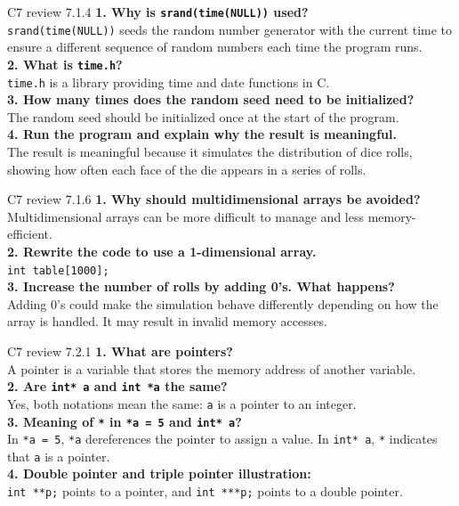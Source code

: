 \documentclass[
	11pt, %
]{beamer}
\begin{document}

\begin{frame}{C7 review 7.1.4}
    \textbf{1. Why is \texttt{srand(time(NULL))} used?} \\
    \texttt{srand(time(NULL))} seeds the random number generator with the current time to ensure a different sequence of random numbers each time the program runs. \\
    \textbf{2. What is \texttt{time.h}?} \\
    \texttt{time.h} is a library providing time and date functions in C. \\
    \textbf{3. How many times does the random seed need to be initialized?} \\
    The random seed should be initialized once at the start of the program. \\
    \textbf{4. Run the program and explain why the result is meaningful.} \\
    The result is meaningful because it simulates the distribution of dice rolls, showing how often each face of the die appears in a series of rolls. \\
\end{frame}


\begin{frame}{C7 review 7.1.6}
    \textbf{1. Why should multidimensional arrays be avoided?} \\
    Multidimensional arrays can be more difficult to manage and less memory-efficient. \\
    \textbf{2. Rewrite the code to use a 1-dimensional array.} \\
    \texttt{int table[1000];} \\
    \textbf{3. Increase the number of rolls by adding 0's. What happens?} \\
    Adding 0's could make the simulation behave differently depending on how the array is handled. It may result in invalid memory accesses.
\end{frame}


\begin{frame}{C7 review  7.2.1}
    \textbf{1. What are pointers?} \\
    A pointer is a variable that stores the memory address of another variable. \\
    \textbf{2. Are \texttt{int* a} and \texttt{int *a} the same?} \\
    Yes, both notations mean the same: \texttt{a} is a pointer to an integer. \\
    \textbf{3. Meaning of \texttt{*} in \texttt{*a = 5} and \texttt{int* a}?} \\
    In \texttt{*a = 5}, \texttt{*a} dereferences the pointer to assign a value. In \texttt{int* a}, \texttt{*} indicates that \texttt{a} is a pointer. \\
    \textbf{4. Double pointer and triple pointer illustration:} \\
    \texttt{int **p;} points to a pointer, and \texttt{int ***p;} points to a double pointer. \\
\end{frame}
\end{document}
